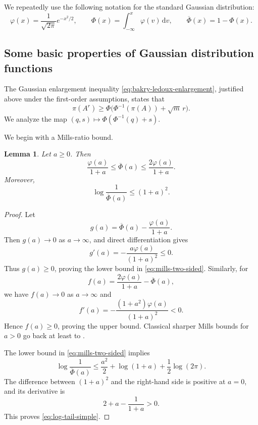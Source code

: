 \documentclass[11pt]{article}
\newtheorem{lemma}[lemma]{Lemma}
\newcommand{\1}{\mathbf 1}
\newcommand{\df}{\mathrm{d}}
\begin{document}
	We repeatedly use the following notation for the standard Gaussian
	distribution:
	\[
	\varphi(x)=\frac{1}{\sqrt{2\pi}}e^{-x^2/2},
	\qquad
	\Phi(x)=\int_{-\infty}^x\varphi(v)\,\df v,
	\qquad
	\overline\Phi(x)=1-\Phi(x).
	\]
	
	
	
	\subsection{Some basic properties of Gaussian distribution functions}
	
	The Gaussian enlargement inequality \eqref{eq:bakry-ledoux-enlargement},
	justified above under the first-order assumptions, states that
	\[
	\pi(A^r)
	\geq
	\Phi\bigl(\Phi^{-1}(\pi(A))+\sqrt{m}\,r\bigr).
	\]
	We analyze the map $(q,s)\mapsto\Phi(\Phi^{-1}(q)+s)$.
	
	We begin with a Mills-ratio bound.
	
	\begin{lemma}
		Let \(a\geq0\).
		Then
		\begin{equation}\label{eq:mills-two-sided}
			\frac{\varphi(a)}{1+a}
			\leq
			\overline\Phi(a)
			\leq
			\frac{2\varphi(a)}{1+a}.
		\end{equation}
		Moreover,
		\begin{equation}\label{eq:log-tail-simple}
			\log\frac1{\overline\Phi(a)}
			\leq
			(1+a)^2.
		\end{equation}
	\end{lemma}
	
	\begin{proof}
		Let
		\[
		g(a)=\overline\Phi(a)-\frac{\varphi(a)}{1+a}.
		\]
		Then \(g(a)\to0\) as \(a\to\infty\), and direct differentiation gives
		\[
		g'(a)=-\frac{a\varphi(a)}{(1+a)^2}\leq0.
		\]
		Thus \(g(a)\geq0\), proving the lower bound in
		\eqref{eq:mills-two-sided}.  Similarly, for
		\[
		f(a)=\frac{2\varphi(a)}{1+a}-\overline\Phi(a),
		\]
		we have \(f(a)\to0\) as $a \to \infty$ and
		\[
		f'(a)=-\frac{(1+a^2)\varphi(a)}{(1+a)^2}<0.
		\]
		Hence \(f(a)\geq0\), proving the upper bound.  Classical sharper Mills
		bounds for \(a>0\) go back at least to \citet{Gordon1941}.
		
		The lower bound in \eqref{eq:mills-two-sided} implies
		\[
		\log\frac1{\overline\Phi(a)}
		\leq
		\frac{a^2}{2}+\log(1+a)+\frac12\log(2\pi).
		\]
		The difference between \((1+a)^2\) and the right-hand side is positive at
		\(a=0\), and its derivative is
		\[
		2+a-\frac1{1+a}>0.
		\]
		This proves \eqref{eq:log-tail-simple}.
	\end{proof}
	
\end{document}
